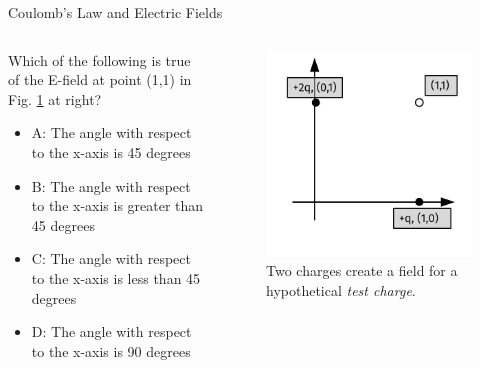 \documentclass{beamer}
\begin{document}
\begin{frame}{Coulomb’s Law and Electric Fields}
\small
\begin{columns}[T]
\begin{column}{0.5\textwidth}
Which of the following is true of the E-field at point (1,1) in Fig. \ref{fig:netfield3} at right?
\begin{itemize}
\item A: The angle with respect to the x-axis is 45 degrees
\item B: The angle with respect to the x-axis is greater than 45 degrees
\item C: The angle with respect to the x-axis is less than 45 degrees
\item D: The angle with respect to the x-axis is 90 degrees
\end{itemize}
\end{column}
\begin{column}{0.5\textwidth}
\begin{figure}
\includegraphics[width=\textwidth]{figures/NetField3.pdf}
\caption{\label{fig:netfield3} Two charges create a field for a hypothetical \textit{test charge}.}
\end{figure}
\end{column}
\end{columns}
\end{frame}
\end{document}
